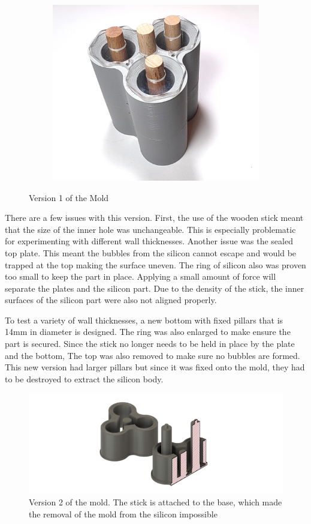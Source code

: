 \documentclass[twoside]{article}
\begin{document}
\begin{figure}[H]
\begin{subfigure}[b]{0.33\linewidth}
		\includegraphics[width=\textwidth]{assembled_v1}
	\end{subfigure}%
	\caption{Version 1 of the Mold}
\end{figure}

There are a few issues with this version. First, the use of the wooden stick meant that the size of the inner hole was unchangeable. This is especially problematic for experimenting with different wall thicknesses. Another issue was the sealed top plate. This meant the bubbles from the silicon cannot escape and would be trapped at the top making the surface uneven. The ring of silicon also was proven too small to keep the part in place. Applying a small amount of force will separate the plates and the silicon part. Due to the density of the stick, the inner surfaces of the silicon part were also not aligned properly. 

To test a variety of wall thicknesses, a new bottom with fixed pillars that is 14mm in diameter is designed. The ring was also enlarged to make ensure the part is secured. Since the stick no longer needs to be held in place by the plate and the bottom, The top was also removed to make sure no bubbles are formed. This new version had larger pillars but since it was fixed onto the mold, they had to be destroyed to extract the silicon body. 

\begin{figure} [H]
\centering
\includegraphics{mold v2}
\caption{Version 2 of the mold. The stick is attached to the base, which made the removal of the mold from the silicon impossible}
\end{figure}
\end{document}
